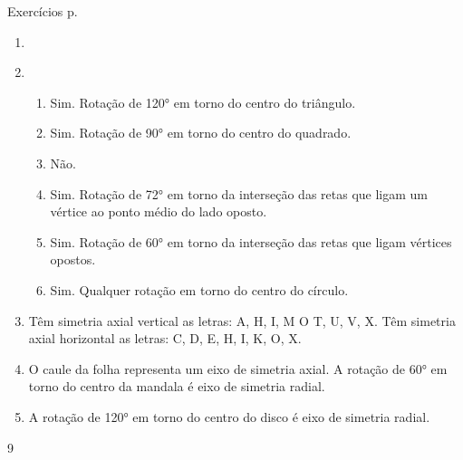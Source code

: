 \begin{answer}{Exercícios p. \pageref{transformacoes-exercise4}}
{\exerciselist
\begin{enumerate}
\item 
\begin{enumerate}
\end{enumerate}

\item
\begin{enumerate}
\item Sim. Rotação de 120° em torno do centro do triângulo.
\item Sim. Rotação de 90° em torno do centro do quadrado.
\item Não. 
\item Sim. Rotação de 72° em torno da interseção das retas que ligam um vértice ao ponto médio do lado oposto.
\item Sim. Rotação de 60° em torno da interseção das retas que ligam vértices opostos.
\item Sim. Qualquer rotação em torno do centro do círculo.
\end{enumerate}

\item Têm simetria axial vertical as letras: A, H, I, M O T, U, V, X. Têm simetria axial horizontal as letras: C, D, E, H, I, K, O, X.

\item O caule da folha representa um eixo de simetria axial. A rotação de 60° em torno do centro da mandala é eixo de simetria radial.

\item A rotação de 120° em torno do centro do disco é eixo de simetria radial.
\end{enumerate}
}{9}
\end{answer}
